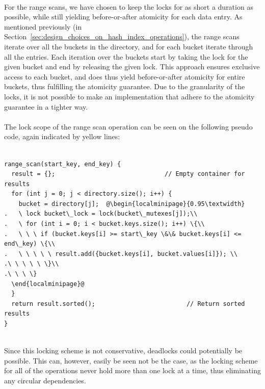 \documentclass[11pt]{report} %
\begin{document}
\vphantom{fill}\\
For the range scans, we have chosen to keep the locks for as short a duration as possible, while still yielding before-or-after atomicity for each data entry. As mentioned previously (in Section~\ref{sec:design_choices_on_hash_index_operations}), the range scans iterate over all the buckets in the directory, and for each bucket iterate through all the entries. Each iteration over the buckets start by taking the lock for the given bucket and end by releasing the given lock. This approach ensures exclusive access to each bucket, and does thus yield before-or-after atomicity for entire buckets, thus fulfilling the atomicity guarantee. Due to the granularity of the locks, it is not possible to make an implementation that adhere to the atomicity guarantee in a tighter way.\\
\\
The lock scope of the range scan operation can be seen on the following pseudo code, again indicated by yellow lines:\\
\\
\begin{fminipage}{\linewidth}
\begin{lstlisting}[escapechar=@]
range_scan(start_key, end_key) {
  result = {};                              // Empty container for results
  for (int j = 0; j < directory.size(); i++) {
    bucket = directory[j];  @\begin{localminipage}{0.95\textwidth}
.   \ lock bucket\_lock = lock(bucket\_mutexes[j]);\\
.   \ for (int i = 0; i < bucket.keys.size(); i++) \{\\
.   \ \ \ if (bucket.keys[i] >= start\_key \&\& bucket.keys[i] <= end\_key) \{\\
.   \ \ \ \ \ result.add({bucket.keys[i], bucket.values[i]}); \\
.\ \ \ \ \ \}\\
.\ \ \ \}
  \end{localminipage}@
  }
  return result.sorted();                         // Return sorted results
}
\end{lstlisting}
\end{fminipage}
\vphantom{fill}\\
Since this locking scheme is not conservative, deadlocks could potentially be possible. This can, however, easily be seen not be the case, as the locking scheme for all of the operations never hold more than one lock at a time, thus eliminating any circular dependencies.
\end{document}

